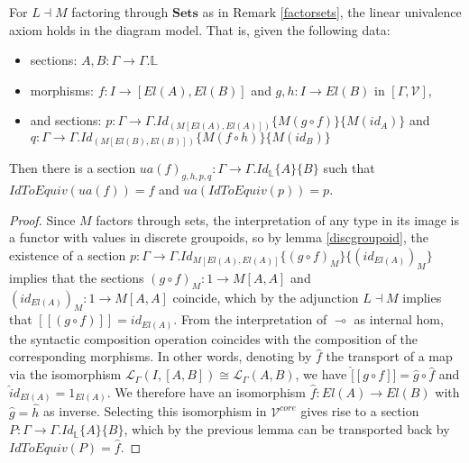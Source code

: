 \documentclass[a4paper,english]{lipics-v2018}
\begin{document}
  \begin{theorem}
    For $L \dashv M$ factoring through $\mathbf{Sets}$ as in Remark \ref{factorsets}, the linear univalence axiom holds in the diagram model. That is, given the following data:
    \begin{itemize}
    \item sections: $A, B : \Gamma \to \Gamma.{\mathbb{L}}$
    \item morphisms: $f : I \to [El(A), El(B)]$ and $g, h : I \to El(B)$ in $[\Gamma, \mathcal{V}]$,
    \item and sections: $p : \Gamma \to \Gamma.Id_{(M[El(A),El(A)])}\{M(g \circ f)\}\{M(id_A)\}$ and $q : \Gamma \to \Gamma.Id_{(M[El(B),El(B)])}\{M(f \circ h)\}\{M(id_B)\}$
    \end{itemize}
    Then there is a section $ua(f)_{g, h, p, q} : \Gamma \to \Gamma.Id_{\mathbb{L}}\{A\}\{B\}$ such that $IdToEquiv(ua(f)) = f$ and $ua(IdToEquiv(p)) = p$.
    \begin{proof}
      Since $M$ factors through sets, the interpretation of any type in its image is a functor with values in discrete groupoids, so by lemma \ref{discgroupoid}, the existence of a section $p : \Gamma \to \Gamma.Id_{M[El(A), El(A)]}\{(g \circ f)_M\}\{(id_{El(A)})_M\}$ implies that the sections $(g \circ f)_M : 1 \to M[A, A]$ and $(id_{El(A)})_M : 1 \to M[A,A]$ coincide, which by the adjunction $L \dashv M$ implies that $[[(g \circ f)]] = id_{El(A)}$. From the interpretation of $\multimap$ as internal hom, the syntactic composition operation coincides with the composition of the corresponding morphisms. In other words, denoting by $\hat f$ the transport of a map via the isomorphism $\mathcal{L}_\Gamma(I, [A,B]) \cong \mathcal{L}_\Gamma(A,B)$, we have $\hat [[g \circ f]] = \hat g \circ \hat f$ and $\hat id_{El(A)} = 1_{El(A)}$. We therefore have an isomorphism $\hat f : El(A) \to El(B)$ with $\hat g = \hat h$ as inverse. Selecting this isomorphism in $\mathcal{V}^{core}$ gives rise to a section $P : \Gamma \to \Gamma.Id_{\mathbb{L}}\{A\}\{B\}$, which by the previous lemma can be transported back by $IdToEquiv(P) = \hat f$.
\end{proof}
\end{theorem}
\end{document}
